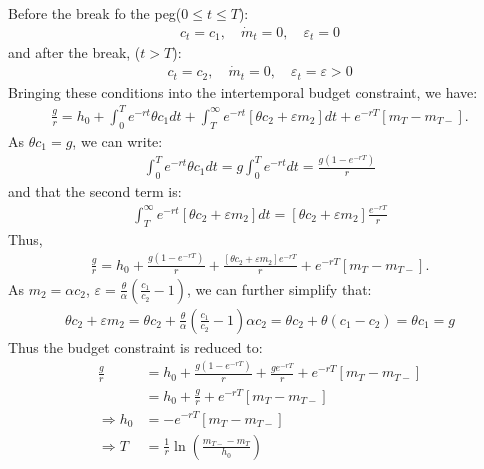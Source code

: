 \documentclass[a4paper,12pt]{article} %
\theoremstyle{nonitalic}
\begin{document}
Before the break fo the peg($0 \leq t \leq T$):
\begin{gather*}
    c_t = c_1, \quad \dot{m}_t = 0, \quad \varepsilon_t = 0
\end{gather*}
and after the break, ($t > T$):
\begin{gather*}
    c_t = c_2, \quad \dot{m}_t = 0, \quad \varepsilon_t = \varepsilon > 0
\end{gather*}
Bringing these conditions into the intertemporal budget constraint, we have:
\begin{gather*}
    \frac{g}{r} = h_0 + \int_{0}^{T} e^{-rt} \theta c_1 dt + \int_{T}^{\infty} e^{-rt} \left[ \theta c_2 + \varepsilon m_2 \right] dt + e^{-rT} \left[ m_T - m_{T-} \right].
\end{gather*}
As $\theta c_1 = g$, we can write:
\begin{gather*}
    \int_{0}^{T} e^{-rt} \theta c_1 dt = g \int_{0}^{T} e^{-rt} dt = \frac{g \left( 1 - e^{-rT} \right)}{r} 
\end{gather*}
and that the second term is:
\begin{gather*}
    \int_{T}^{\infty} e^{-rt} \left[ \theta c_2 + \varepsilon m_2 \right] dt = [\theta c_2 + \varepsilon m_2] \frac{e^{-rT}}{r} 
\end{gather*}
Thus,
\begin{gather*}
    \frac{g}{r} = h_0 + \frac{g \left( 1 - e^{-rT} \right)}{r} + \frac{[\theta c_2 + \varepsilon m_2] e^{-rT}}{r} + e^{-rT} \left[ m_T - m_{T-} \right].
\end{gather*}
As $m_2 = \alpha c_2$, $\varepsilon = \frac{\theta}{\alpha} \left( \frac{c_1}{c_2} -1 \right)$, we can further simplify that:
\begin{gather*}
    \theta c_2 + \varepsilon m_2 = \theta c_2 + \frac{\theta}{\alpha} \left( \frac{c_1}{c_2} -1 \right) \alpha c_2 = \theta c_2 + \theta (c_1 - c_2) = \theta c_1 = g
\end{gather*}
Thus the budget constraint is reduced to:
\begin{align*}
    \frac{g}{r} &= h_0 + \frac{g \left( 1 - e^{-rT} \right)}{r} + \frac{g e^{-rT}}{r} + e^{-rT} \left[ m_T - m_{T-} \right] \\
                &= h_0 + \frac{g}{r} + e^{-rT} [m_T - m_{T-} ] \\
    \Rightarrow h_0 &= -e^{-rT} [m_T - m_{T-}] \\
    \Rightarrow T &= \frac{1}{r} \ln \left( \frac{m_{T-} - m_T}{h_0} \right)
\end{align*}
\end{document}
